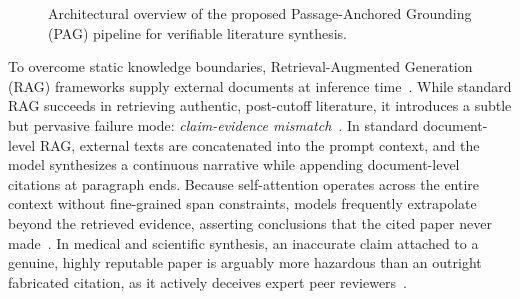 \documentclass[acmsmall,screen]{acmart}
\begin{document}
\begin{figure}[t]
\centering
{}
\caption{Architectural overview of the proposed Passage-Anchored Grounding (PAG) pipeline for verifiable literature synthesis.}
\label{fig:pipeline_overview}
\end{figure}

To overcome static knowledge boundaries, Retrieval-Augmented Generation (RAG) frameworks supply external documents at inference time~\cite{lewis2020rag}. While standard RAG succeeds in retrieving authentic, post-cutoff literature, it introduces a subtle but pervasive failure mode: \emph{claim-evidence mismatch}~\cite{gao2023alce,min2023factscore}. In standard document-level RAG, external texts are concatenated into the prompt context, and the model synthesizes a continuous narrative while appending document-level citations at paragraph ends. Because self-attention operates across the entire context without fine-grained span constraints, models frequently extrapolate beyond the retrieved evidence, asserting conclusions that the cited paper never made~\cite{asai2024selfrag}. In medical and scientific synthesis, an inaccurate claim attached to a genuine, highly reputable paper is arguably more hazardous than an outright fabricated citation, as it actively deceives expert peer reviewers~\cite{gao2023abstracts,alkaissi2023}.
\end{document}
